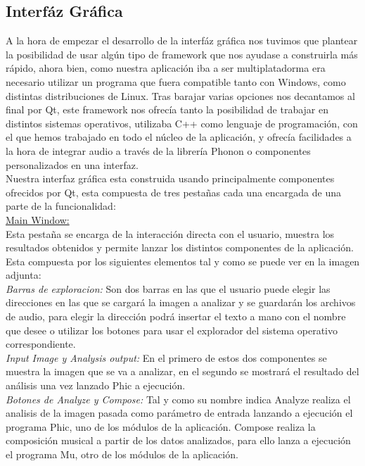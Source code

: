 \subsection{Interfáz Gráfica}

A la hora de empezar el desarrollo de la interfáz gráfica nos tuvimos que plantear la posibilidad de usar algún tipo de framework que nos ayudase a construirla más rápido, ahora bien, como nuestra aplicación iba a ser multiplatadorma era necesario utilizar un programa que fuera compatible tanto con Windows, como distintas distribuciones de Linux. Tras barajar varias opciones nos decantamos al final por Qt, este framework nos ofrecía tanto la posibilidad de trabajar en distintos sistemas operativos, utilizaba C++ como lenguaje de programación, con el que hemos trabajado en todo el núcleo de la aplicación, y ofrecía facilidades a la hora de integrar audio a través de la librería Phonon o componentes personalizados en una interfaz.\\
\newline
Nuestra interfaz gráfica esta construida usando principalmente componentes ofrecidos por Qt, esta compuesta de tres pestañas cada una encargada de una parte de la funcionalidad:
\newline
\\\underline{Main Window:}
\\Esta pestaña se encarga de la interacción directa con el usuario, muestra los resultados obtenidos y permite lanzar los distintos componentes de la aplicación. 
\\Esta compuesta por los siguientes elementos tal y como se puede ver en la imagen adjunta:
\newline
\\\textit{Barras de exploracion:} Son dos barras en las que el usuario puede elegir las direcciones en las que se cargará la imagen a analizar y se guardarán los archivos de audio, para elegir la dirección podrá insertar el texto a mano con el nombre que desee o utilizar los botones para usar el explorador del sistema operativo correspondiente.
\\\textit{Input Image y Analysis output:} En el primero de estos dos componentes se muestra la imagen que se va a analizar, en el segundo se mostrará el resultado del análisis una vez lanzado Phic a ejecución.
\\\textit{Botones de Analyze y Compose:} Tal y como su nombre indica Analyze realiza el analisis de la imagen pasada como parámetro de entrada lanzando a ejecución el programa Phic, uno de los módulos de la aplicación. Compose realiza la composición musical a partir de los datos analizados, para ello lanza a ejecución el programa Mu, otro de los módulos de la aplicación.
